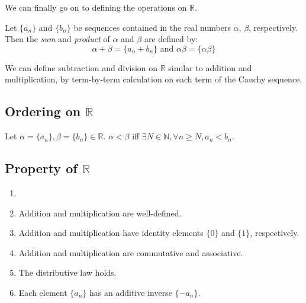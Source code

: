 \documentclass{report}
\begin{document}
			We can finally go on to defining the operations on $\mathbb{R}$.
		
			\begin{defn} \label{def_add_mult_R}
				Let $\{a_n\}$ and $\{b_n\}$ be sequences contained in the real numbers $\alpha$, $\beta$, respectively. Then the \emph{sum} and \emph{product} of $\alpha$ and $\beta$ are defined by:
				\begin{displaymath}
					\alpha+\beta=\{a_n+b_n\} \text{   and   } \alpha\beta=\{\alpha\beta\}
				\end{displaymath}
			\end{defn}
		
			We can define subtraction and division on $\mathbb{R}$ similar to addition and multiplication, by term-by-term calculation on each term of the Cauchy sequence.
		
		\subsection{Ordering on $\mathbb{R}$}
		
			\begin{defn} \label{def_order_R}
				Let $\alpha=\{a_n\},\beta=\{b_n\} \in \mathbb{R}$. $\alpha<\beta$ iff $\exists N \in \mathbb{N}, \forall n \ge N, a_n<b_n$.
			\end{defn}
		
		\subsection{Property of $\mathbb{R}$}
		
			\begin{thm} \label{thm_property_R}
				\begin{enumerate}
					\item[]
					\item Addition and multiplication are well-defined.
					\item Addition and multiplication have identity elements $\{0\}$ and $\{1\}$, respectively.
					\item Addition and multiplication are commutative and associative.
					\item The distributive law holds.
					\item Each element $\{a_n\}$ has an additive inverse $\{-a_n\}$.
				\end{enumerate}
			\end{thm}
		
\end{document}
